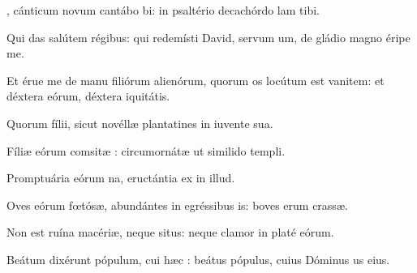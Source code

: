 \item {}, cánticum novum cantábo bi:\psstar{} in psaltério decachórdo lam tibi.

\item Qui das salútem régibus:\pscross{} qui redemísti David, servum um,\psstar{} de gládio magno éripe me.

\item Et érue me de manu filiórum alienórum,\pscross{} quorum os locútum est vanitem:\psstar{} et déxtera eórum, déxtera iquitátis.

\item Quorum fílii, sicut novéllæ plantatines\psstar{} in iuvente sua.

\item Fíliæ eórum comsitæ :\psstar{} circumornátæ ut similido templi.

\item Promptuária eórum na,\psstar{} eructántia ex  in illud.

\item Oves eórum fœtósæ, abundántes in egréssibus is:\psstar{} boves erum crassæ.

\item Non est ruína macériæ, neque situs:\psstar{} neque clamor in platé eórum.

\item Beátum dixérunt pópulum, cui hæc :\psstar{} beátus pópulus, cuius Dóminus us eius.
